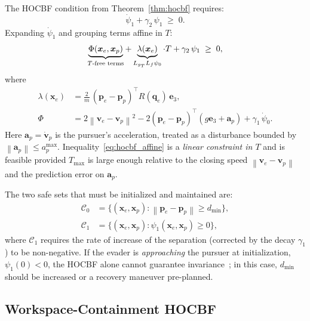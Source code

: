 \documentclass[lettersize,journal]{IEEEtran}
\theoremstyle{definition}
\theoremstyle{remark}
\newcommand{\norm}[1]{\left\| #1 \right\|}
\newcommand{\vect}[1]{\bm{#1}}
\begin{document}
The HOCBF condition from Theorem~\ref{thm:hocbf} requires:
\begin{equation}
    \dot{\psi}_1 + \gamma_2\,\psi_1 \;\geq\; 0.
    \label{eq:hocbf_cond2}
\end{equation}
Expanding $\dot{\psi}_1$ and grouping terms affine in $T$:
\begin{equation}
    \underbrace{%
        \Phi(\vect{x}_e,\vect{x}_p)
    }_{\text{$T$-free terms}}
    + \underbrace{%
        \lambda(\vect{x}_e)
    }_{L_{g_T}L_f\psi_0}\cdot T
    + \gamma_2\,\psi_1 \;\geq\; 0,
    \label{eq:hocbf_affine}
\end{equation}
where
\begin{align}
    \lambda(\vect{x}_e)
        &= \frac{2}{m}\,(\vect{p}_e-\vect{p}_p)^\top R(\vect{q}_e)\,\vect{e}_3,
        \label{eq:lambda} \\
    \Phi &= 2\norm{\vect{v}_e-\vect{v}_p}^2
             - 2(\vect{p}_e-\vect{p}_p)^\top(g\vect{e}_3+\vect{a}_p)
             + \gamma_1\,\dot{\psi}_0.
        \label{eq:Phi}
\end{align}
Here $\vect{a}_p = \dot{\vect{v}}_p$ is the pursuer's acceleration,
treated as a disturbance bounded by $\norm{\vect{a}_p}\leq a_p^{\max}$.
Inequality~\eqref{eq:hocbf_affine} is a \emph{linear constraint in $T$}
and is feasible provided $T_{\max}$ is large enough relative to the
closing speed $\norm{\vect{v}_e - \vect{v}_p}$ and the prediction
error on $\vect{a}_p$.

The two safe sets that must be initialized and maintained are:
\begin{align}
    \mathcal{C}_0 &= \bigl\{(\vect{x}_e,\vect{x}_p):
                     \norm{\vect{p}_e-\vect{p}_p}\geq d_{\min}\bigr\},
                  \label{eq:C0} \\
    \mathcal{C}_1 &= \bigl\{(\vect{x}_e,\vect{x}_p):
                     \psi_1(\vect{x}_e,\vect{x}_p)\geq 0\bigr\},
                  \label{eq:C1}
\end{align}
where $\mathcal{C}_1$ requires the rate of increase of the separation
(corrected by the decay $\gamma_1$) to be non-negative.
If the evader is \emph{approaching} the pursuer at initialization,
$\psi_1(0) < 0$, the HOCBF alone cannot guarantee
invariance~\cite{xiao2021high}; in this case, $d_{\min}$ should be
increased or a recovery maneuver pre-planned.

\subsection{Workspace-Containment HOCBF}
\label{sec:ws_cbf}
\end{document}
